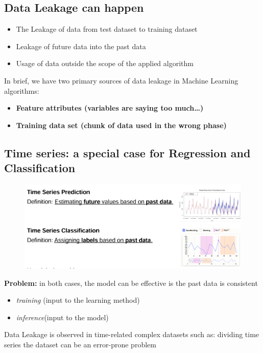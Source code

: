 \documentclass{report}
\begin{document}
\subsection{Data Leakage can happen}
\begin{itemize}
    \item The Leakage of data from test dataset to training dataset
    \item Leakage of future data into the past data
    \item  Usage of data outside the scope of the applied algorithm
\end{itemize}


\noindent In brief, we have two primary sources of data leakage in Machine Learning algorithms:
\begin{itemize}
    \item \textbf{Feature attributes (variables are saying too much…) }
    \item \textbf{Training data set (chunk of data used in the wrong phase) }
\end{itemize}

\subsection{Time series: a special case for Regression and Classification}
\begin{figure}[H]
    \centering
    \includegraphics[width=0.8\linewidth]{images/time series.png}
\end{figure}

\noindent \textbf{Problem:} in both cases, the model can be effective is the past data is consistent 
\begin{itemize}
    \item \textit{training} (input to the learning method)
    \item \textit{inference}(input to the model)
\end{itemize}

\noindent Data Leakage is observed in time-related complex datasets such as: 
dividing time series the dataset can be an error-prone problem
\end{document}
